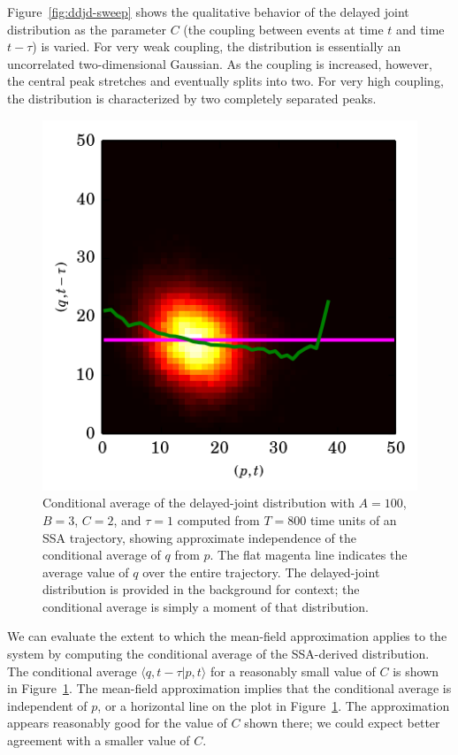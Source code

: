 \documentclass[english,letterpaper,12pt]{report}
\begin{document}
\begin{doublespacing}
Figure~\ref{fig:ddjd-sweep} shows the qualitative behavior of the delayed joint distribution as the parameter $C$ (the coupling between events at time $t$ and time $t - \tau$) is varied. For very weak coupling, the distribution is essentially an uncorrelated two-dimensional Gaussian. As the coupling is increased, however, the central peak stretches and eventually splits into two. For very high coupling, the distribution is characterized by two completely separated peaks.

\begin{figure}
    \begin{center}
        \includegraphics{../results/thesis/ddjd-ca-a100-c2-t1.png}
    \end{center}
    \caption{Conditional average of the delayed-joint distribution with $A=100$, $B=3$, $C=2$, and $\tau=1$ computed from $T=800$ time units of an SSA trajectory, showing approximate independence of the conditional average of $q$ from $p$. The flat magenta line indicates the average value of $q$ over the entire trajectory. The delayed-joint distribution is provided in the background for context; the conditional average is simply a moment of that distribution.}
    \label{fig:ddjd-stable}
\end{figure}

We can evaluate the extent to which the mean-field approximation applies to the system by computing the conditional average of the SSA-derived distribution. The conditional average $\langle q, t - \tau | p, t \rangle$ for a reasonably small value of $C$ is shown in Figure~\ref{fig:ddjd-stable}. The mean-field approximation implies that the conditional average is independent of $p$, or a horizontal line on the plot in Figure~\ref{fig:ddjd-stable}. The approximation appears reasonably good for the value of $C$ shown there; we could expect better agreement with a smaller value of $C$.


\end{doublespacing}
\end{document}
